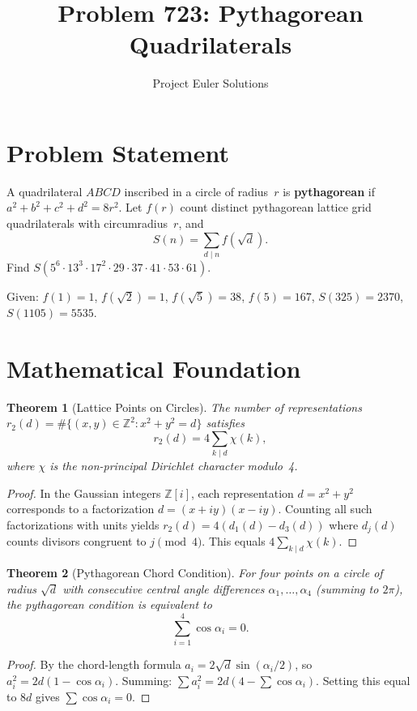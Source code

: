 \documentclass[11pt]{article}
\title{Problem 723: Pythagorean Quadrilaterals}
\author{Project Euler Solutions}
\date{}
\newtheorem{theorem}{Theorem}
\begin{document}
\maketitle

\section{Problem Statement}

A quadrilateral $ABCD$ inscribed in a circle of radius~$r$ is \textbf{pythagorean} if $a^2+b^2+c^2+d^2 = 8r^2$. Let $f(r)$ count distinct pythagorean lattice grid quadrilaterals with circumradius~$r$, and
\[
S(n) = \sum_{d \mid n} f(\sqrt{d}).
\]
Find $S(5^6 \cdot 13^3 \cdot 17^2 \cdot 29 \cdot 37 \cdot 41 \cdot 53 \cdot 61)$.

Given: $f(1)=1$, $f(\sqrt{2})=1$, $f(\sqrt{5})=38$, $f(5)=167$, $S(325)=2370$, $S(1105)=5535$.

\section{Mathematical Foundation}

\begin{theorem}[Lattice Points on Circles]
The number of representations $r_2(d) = \#\{(x,y)\in\mathbb{Z}^2 : x^2+y^2=d\}$ satisfies
\[
r_2(d) = 4\sum_{k \mid d} \chi(k),
\]
where $\chi$ is the non-principal Dirichlet character modulo~4.
\end{theorem}

\begin{proof}
In the Gaussian integers $\mathbb{Z}[i]$, each representation $d = x^2+y^2$ corresponds to a factorization $d = (x+iy)(x-iy)$. Counting all such factorizations with units yields $r_2(d) = 4(d_1(d) - d_3(d))$ where $d_j(d)$ counts divisors congruent to $j\pmod{4}$. This equals $4\sum_{k\mid d}\chi(k)$.
\end{proof}

\begin{theorem}[Pythagorean Chord Condition]
For four points on a circle of radius $\sqrt{d}$ with consecutive central angle differences $\alpha_1,\ldots,\alpha_4$ (summing to $2\pi$), the pythagorean condition is equivalent to
\[
\sum_{i=1}^{4} \cos\alpha_i = 0.
\]
\end{theorem}

\begin{proof}
By the chord-length formula $a_i = 2\sqrt{d}\sin(\alpha_i/2)$, so $a_i^2 = 2d(1-\cos\alpha_i)$. Summing: $\sum a_i^2 = 2d(4 - \sum\cos\alpha_i)$. Setting this equal to $8d$ gives $\sum\cos\alpha_i = 0$.
\end{proof}
\end{document}
